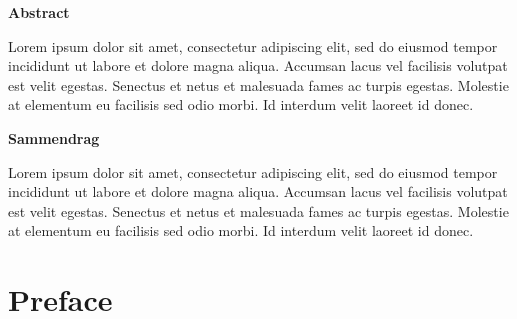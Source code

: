     \begin{center}\textsf{\textbf{\large Abstract}}\end{center} 

    Lorem ipsum dolor sit amet, consectetur adipiscing elit, sed do eiusmod tempor incididunt ut labore et dolore magna aliqua. Accumsan lacus vel facilisis volutpat est velit egestas. Senectus et netus et malesuada fames ac turpis egestas. Molestie at elementum eu facilisis sed odio morbi. Id interdum velit laoreet id donec.

    \begin{center}\textsf{\textbf{\large Sammendrag}}\end{center} 

    Lorem ipsum dolor sit amet, consectetur adipiscing elit, sed do eiusmod tempor incididunt ut labore et dolore magna aliqua. Accumsan lacus vel facilisis volutpat est velit egestas. Senectus et netus et malesuada fames ac turpis egestas. Molestie at elementum eu facilisis sed odio morbi. Id interdum velit laoreet id donec.
\clearpage


\chapter*{Preface}


\setcounter{tocdepth}{3}
\tableofcontents